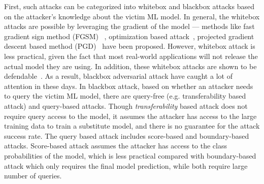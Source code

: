 First, such attacks can be categorized into whitebox and blackbox attacks based on the attacker's knowledge about the victim ML model. In general, the whitebox attacks are possible by leveraging the gradient of the model --- methods like fast gradient sign method (FGSM) ~\cite{goodfellow2014explaining}, optimization based attack~\cite{carlini2017towards}, projected gradient descent based method (PGD)~\cite{madry2017towards} have been proposed. However, whitebox attack is less practical, given the fact that most real-world applications will not release the actual model they are using. In addition, these whitebox attacks are shown to be defendable~\cite{madry2017towards}.
As a result, blackbox adversarial attack have caught a lot of attention in these days.
In blackbox attack, based on whether an attacker needs to query the victim ML model, there are query-free (e.g. transferability based attack) and query-based attacks. Though \emph{transferability} based attack does not require query access to the model, it assumes the attacker has access to the large training data to train a substitute model, and there is no guarantee for the attack success rate. The query based attack includes score-based and boundary-based attacks. Score-based attack assumes the attacker has access to the class probabilities of the model, which is less practical compared with boundary-based attack which only requires the final model prediction, while both require large number of queries. 


